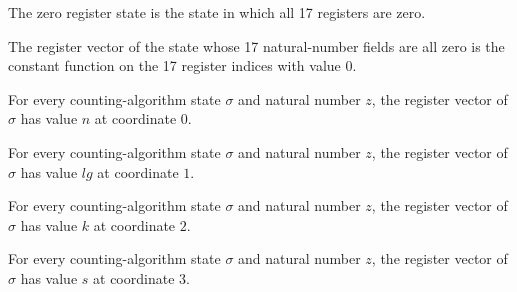 \begin{definition}
\label{Complexity.LogProg.ISCount.St.zero}
\leanok
{}
The zero register state is the state in which all 17 registers are zero.
\end{definition}

\begin{lemma}
\label{Complexity.LogProg.ISCount.St.toV_zero}
\leanok
{}
The register vector of the state whose 17 natural-number fields are all zero is the
constant function on the 17 register indices with value $0$.
\end{lemma}

\begin{lemma}
\label{Complexity.LogProg.ISCount.St.toV_n}
\leanok
{}
For every counting-algorithm state $\sigma$ and natural number $z$, the register vector
of $\sigma$ has value $n$ at coordinate $0$.
\end{lemma}

\begin{lemma}
\label{Complexity.LogProg.ISCount.St.toV_lg}
\leanok
{}
For every counting-algorithm state $\sigma$ and natural number $z$, the register vector
of $\sigma$ has value $lg$ at coordinate $1$.
\end{lemma}

\begin{lemma}
\label{Complexity.LogProg.ISCount.St.toV_k}
\leanok
{}
For every counting-algorithm state $\sigma$ and natural number $z$, the register vector
of $\sigma$ has value $k$ at coordinate $2$.
\end{lemma}

\begin{lemma}
\label{Complexity.LogProg.ISCount.St.toV_s}
\leanok
{}
For every counting-algorithm state $\sigma$ and natural number $z$, the register vector
of $\sigma$ has value $s$ at coordinate $3$.
\end{lemma}

